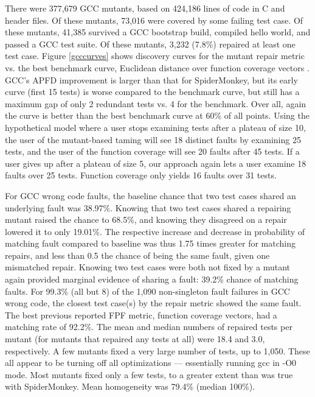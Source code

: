There were 377,679 GCC mutants, based on 424,186 lines of code in C and header files. Of these mutants, 73,016 were covered by some failing test case.  Of these mutants, 41,385 survived a GCC bootstrap build, compiled hello world, and passed a GCC test suite.  Of these mutants, 3,232 (7.8\%) repaired at least one test case.  Figure \ref{gcccurves} shows discovery curves for the mutant repair metric vs. the best benchmark curve, Euclidean distance over function coverage vectors \cite{PLDI13}.  GCC's APFD improvement is larger than that for SpiderMonkey, but its early curve (first 15 tests) is worse compared to the benchmark curve, but still has a maximum gap of only 2 redundant tests vs. 4 for the benchmark.  Over all, again the curve is better than the best benchmark curve at 60\% of all points.  Using the hypothetical model where a user stops examining tests after a plateau of size 10, the user of the mutant-based taming will see 18 distinct faults by examining 25 tests, and the user of the function coverage will see 20 faults after 45 tests.  If a user gives up after a plateau of size 5, our approach again lets a user examine 18 faults over 25 tests.  Function coverage only yields 16 faults over 31 tests. 


For GCC wrong code faults, the baseline chance that two test cases shared an underlying fault was 38.97\%.  Knowing that two test cases shared a repairing mutant raised the chance to 68.5\%, and knowing they disagreed on a repair lowered it to only 19.01\%.  The respective increase and decrease in probability of matching fault compared to baseline was thus 1.75 times greater for matching repairs, and less than 0.5 the chance of being the same fault, given one mismatched repair.  Knowing two test cases were both not fixed by a mutant again provided marginal evidence of sharing a fault: 39.2\% chance of matching faults.
For 99.3\% (all but 8) of the 1,090 non-singleton fault failures in GCC wrong code, the closest test case(s) by the repair metric showed the same fault.  The best previous reported FPF metric, function coverage vectors, had a matching rate of 92.2\%.   The mean and median numbers of repaired tests per mutant (for mutants that repaired any tests at all) were 18.4 and 3.0, respectively.  A few mutants fixed a very large number of tests, up to 1,050.  These all appear to be turning off all optimizations --- essentially running gcc in -O0 mode.  Most mutants fixed only a few tests, to a greater extent than was true with SpiderMonkey.    Mean homogeneity was 79.4\% (median 100\%).

